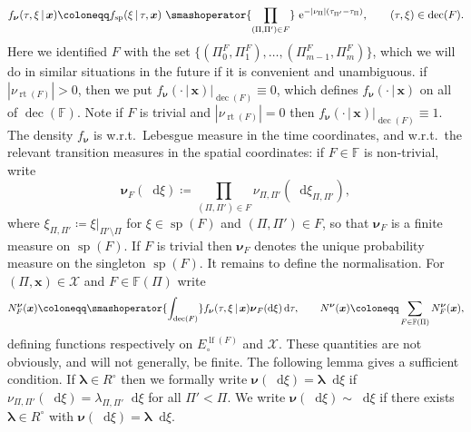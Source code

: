 \documentclass[reqno,draft]{amsart}
\numberwithin{equation}{section}
\theoremstyle{plain}
\theoremstyle{remark}
\newcommand*\diff{\mathop{}\!\mathrm{d}}
\newcommand{\e}{\mathrm{e}}
\newcommand{\fpart}{\Pi} %
\newcommand{\rates}{R^\circ} %
\DeclareMathOperator{\lf}{lf}
\DeclareMathOperator{\rt}{rt}
\DeclareMathOperator{\dcb}{dec}
\DeclareMathOperator{\dcs}{sp}
\newcommand{\smashop}[1]{\,\,\smashoperator{#1}\,\,}
\newcommand{\fsp}{f_\mathrm{sp}}
\newcommand{\fnu}{f_{\boldsymbol \nu}}
\newcommand{\nut}[1]{|\nu_{#1}|}
\begin{document}
    \begin{equation}\label{eq:fnu}
        \fnu(\tau,\xi \,\vert\,\boldsymbol x) \coloneqq \fsp(\xi \,\vert\,\tau,\boldsymbol x) \smashop{\prod_{(\fpart,\fpart') \in F}} \e^{-\nut{\fpart}(\tau_{\fpart'}-\tau_\fpart)},\qquad (\tau,\xi) \in \dcb(F).
    \end{equation}
    Here we identified $F$ with the set $\{(\fpart_0^F,\fpart_1^F), \ldots ,(\fpart^F_{m-1},\fpart^F_m)\}$, which we will do in similar situations in the future if it is convenient and unambiguous.
    if $\nut{\rt(F)} > 0$, then we put $\fnu(\cdot \,\vert\,\boldsymbol x) \vert_{\dcb(F)}\equiv 0$, which defines $\fnu(\cdot \,\vert\,\boldsymbol x)$ on all of $\dcb(\mathbb{F})$. Note if $F$ is trivial and $\nut{\rt(F)} = 0$ then $\fnu(\cdot \,\vert\,\boldsymbol x) \vert_{\dcb(F)} \equiv 1$. The density $\fnu$ is w.r.t.\ Lebesgue measure in the time coordinates, and w.r.t.\ the relevant transition measures in the spatial coordinates: if $F\in \mathbb{F}$ is non-trivial, write
    \begin{equation}\label{eq:nu_F}
        \boldsymbol \nu_F(\diff \xi) \coloneqq \prod_{(\fpart,\fpart') \in F} \nu_{\fpart,\fpart'}(\diff \xi_{\fpart,\fpart'}),
    \end{equation}
where $\xi_{\fpart,\fpart'}\coloneqq \xi \vert_{\fpart'\setminus \fpart}$ for $\xi \in \dcs(F)$ and $(\fpart,\fpart') \in F$, so that $\boldsymbol \nu_F$ is a finite measure on $\dcs(F)$. If $F$ is trivial then $\boldsymbol \nu_F$ denotes the unique probability measure on the singleton $\dcs(F)$. It remains to define the normalisation. For $(\fpart,\boldsymbol x)\in \mathcal{X}$ and $F\in \mathbb{F}(\fpart)$ write
\begin{equation*}%
    N^{\boldsymbol \nu}_F(\boldsymbol x) \coloneqq \smashoperator{\int_{\dcb(F)}} \fnu(\tau,\xi \,\vert\,\boldsymbol x) \boldsymbol \nu_F(\diff \xi) \diff \tau,\qquad
    N^{\boldsymbol \nu}(\boldsymbol x) \coloneqq \sum_{F\in \mathbb{F}(\fpart)} N_F^{\boldsymbol \nu}(\boldsymbol x),%
\end{equation*}
defining functions respectively on $E^{\lf(F)}_\circ $ and $\mathcal{X}$. These quantities are not obviously, and will not generally, be finite. The following lemma gives a sufficient condition. If $\boldsymbol \lambda \in \rates$ then we formally write $\boldsymbol \nu(\diff \xi) = \boldsymbol \lambda \diff \xi$ if $\nu_{\fpart,\fpart'}(\diff \xi) = \lambda_{\fpart,\fpart'}\diff \xi$ for all $\fpart'<\fpart$. We write $\boldsymbol \nu(\diff \xi) \sim \diff \xi$ if there exists $\boldsymbol \lambda \in \rates$ with $\boldsymbol \nu(\diff \xi) = \boldsymbol \lambda \diff \xi$.
\end{document}
